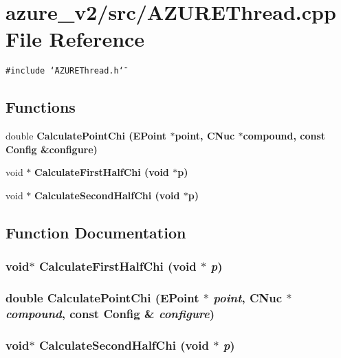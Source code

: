 \section{azure\_\-v2/src/AZUREThread.cpp File Reference}
\label{AZUREThread_8cpp}
{\tt \#include \char`\"{}AZUREThread.h\char`\"{}}\par
\subsection*{Functions}
\begin{CompactItemize}
\item 
double \bf{Calculate\-Point\-Chi} (\bf{EPoint} $\ast$point, \bf{CNuc} $\ast$compound, const \bf{Config} \&configure)
\item 
void $\ast$ \bf{Calculate\-First\-Half\-Chi} (void $\ast$p)
\item 
void $\ast$ \bf{Calculate\-Second\-Half\-Chi} (void $\ast$p)
\end{CompactItemize}


\subsection{Function Documentation}
\subsubsection{\setlength{\rightskip}{0pt plus 5cm}void$\ast$ Calculate\-First\-Half\-Chi (void $\ast$ {\em p})}\label{AZUREThread_8cpp_eb42f712bd2515b81b71c971c11d9bd0}


\subsubsection{\setlength{\rightskip}{0pt plus 5cm}double Calculate\-Point\-Chi (\bf{EPoint} $\ast$ {\em point}, \bf{CNuc} $\ast$ {\em compound}, const \bf{Config} \& {\em configure})}\label{AZUREThread_8cpp_2c205de368090242db5c0ac6696e2190}


\subsubsection{\setlength{\rightskip}{0pt plus 5cm}void$\ast$ Calculate\-Second\-Half\-Chi (void $\ast$ {\em p})}\label{AZUREThread_8cpp_b84a514162af11db060a9561e6a33d57}


